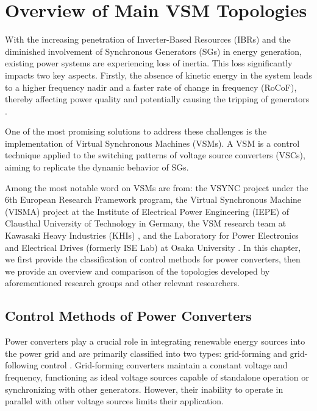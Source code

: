 \chapter{Overview of Main VSM Topologies}\label{chap:vsm-overview}

With the increasing penetration of Inverter-Based Resources (IBRs) and the
diminished involvement of Synchronous Generators (SGs) in energy generation,
existing power systems are experiencing loss of inertia. This loss
significantly impacts two key aspects. Firstly, the absence of kinetic energy in
the system leads to a higher frequency nadir and a faster rate of change in
frequency (RoCoF), thereby affecting power quality and potentially causing the
tripping of generators \cite{alipoor2015power}.

One of the most promising solutions to address these challenges is the
implementation of Virtual Synchronous Machines (VSMs). A VSM is a control
technique applied to the switching patterns of voltage source converters (VSCs),
aiming to replicate the dynamic behavior of SGs.

Among the most notable word on VSMs are from: the VSYNC project
\cite{visscher2008vsg} under the 6th European Research Framework program, the
Virtual Synchronous Machine (VISMA) project \cite{beck2007vsm} at the Institute
of Electrical Power Engineering (IEPE) of Clausthal University of Technology in
Germany, the VSM research team at Kawasaki Heavy Industries (KHIs)
\cite{hirase2013grid}, and the Laboratory for Power Electronics and Electrical
Drives (formerly ISE Lab) at Osaka University \cite{alipoor2015power,
sakimoto2011stabilization, liu2017vsg}. In this chapter, we first provide the
classification  of control methods for power converters, then we provide an
overview and comparison of the topologies developed by aforementioned research
groups and other relevant researchers.

\section{Control Methods of Power Converters}\label{sec:control_methods}

Power converters play a crucial role in integrating renewable energy sources
into the power grid and are primarily classified into two types: grid-forming
and grid-following control \cite{blaabjerg2018control}. Grid-forming converters
maintain a constant voltage and frequency, functioning as ideal voltage sources
capable of standalone operation or synchronizing with other generators. However,
their inability to operate in parallel with other voltage sources limits their
application.

